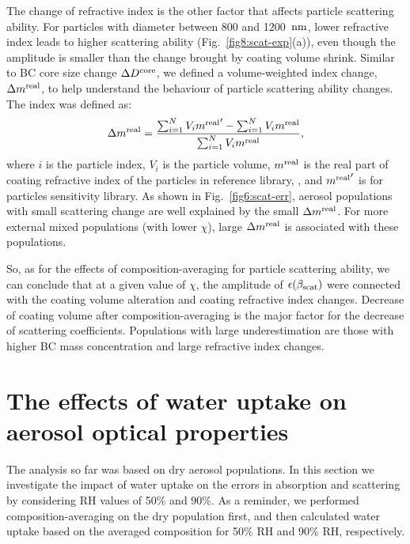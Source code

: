 \documentclass[edeposit,fullpage]{uiucthesis2009}
\makeatletter
\DeclareRobustCommand*\unit[1]
 {\ensuremath{%
   {\thinmuskip3mu\relax
    \def\mu{\text{\textmu}}\def~{\,}%
    \ifx\f@series\testbx\mathbf{#1}\else\mathrm{#1}\fi}}}
\makeatother
\begin{document}
The change of refractive index is the other factor that affects particle scattering ability. For particles with diameter between 800 and 1200~\unit{nm}, lower refractive index leads to higher scattering ability (Fig.~\ref{fig8:scat-exp}(a)), even though the amplitude is smaller than the change brought by coating volume shrink. Similar to BC core size change $\Delta D^{\rm core}$, we defined a volume-weighted index change, $\Delta{m^{\rm real}}$, to help understand the behaviour of particle scattering ability changes. The index was defined as:
\begin{equation}
    \displaystyle \Delta{m^{\rm real}}=\frac{\sum_{i=1}^{N} V_i {m^{\rm real}}' - \sum_{i=1}^{N} V_i {m^{\rm real}}}{\sum_{i=1}^{N} V_i {m^{\rm real}}},
\end{equation}
where $i$ is the particle index, $V_i$ is the particle volume, 
${m^{\rm real}}$ is the real part of coating refractive index of the particles in reference library,
, and ${m^{\rm real}}'$ is for particles sensitivity library. As shown in Fig.~\ref{fig6:scat-err}, aerosol populations with small scattering change are well explained by the small $\Delta{m^{\rm real}}$. For more external mixed populations (with lower $\chi$), large $\Delta{m^{\rm real}}$ is associated with these populations.

So, as for the effects of composition-averaging for particle scattering ability, we can conclude that at a given value of $\chi$, the amplitude of $\epsilon(\beta_{\rm scat})$ were connected with the coating volume alteration and coating refractive index changes. Decrease of coating volume after composition-averaging is the major factor for the decrease of scattering coefficients. Populations with large underestimation are those with higher BC mass concentration and large refractive index changes.  

\section{The effects of water uptake on aerosol optical properties}
\label{sec:wet-case}
The analysis so far was based on dry aerosol populations. In this
section we investigate the impact of water uptake on the errors in
absorption and scattering by considering RH values of 50\% and 90\%.
As a reminder, we performed composition-averaging on the dry
population first, and then calculated water uptake based on the
averaged composition for 50\% RH and 90\% RH, respectively.
\end{document}
